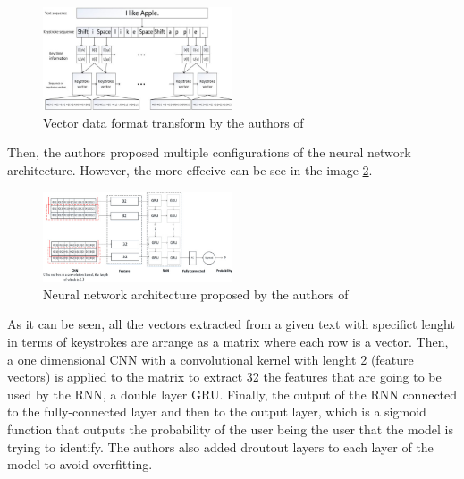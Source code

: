 \begin{figure}[H]
	\centering
	\includegraphics[width=0.5\textwidth]{images/vectorization.jpg}
	\caption{Vector data format transform by the authors of \cite{deep_learning}}
	\label{fig:deep_learning_vector_data_format}
\end{figure}

Then, the authors proposed multiple configurations of the neural network architecture. However, the more effecive can be see in the image \ref{fig:deep_learning_architecture}.

\begin{figure}[H]
	\centering
	\includegraphics[width=0.5\textwidth]{images/architecture.jpg}
	\caption{Neural network architecture proposed by the authors of \cite{deep_learning}}
	\label{fig:deep_learning_architecture}
\end{figure}

As it can be seen, all the vectors extracted from a given text with specifict lenght in terms of keystrokes are arrange as a matrix where each row is a vector. Then, a one dimensional CNN with a convolutional kernel with lenght 2 (feature vectors) is applied to the matrix to extract 32 the features that are going to be used by the RNN, a double layer GRU. Finally, the output of the RNN connected to the fully-connected layer and then to the output layer, which is a sigmoid function that outputs the probability of the user being the user that the model is trying to identify. The authors also added droutout layers to each layer of the model to avoid overfitting.